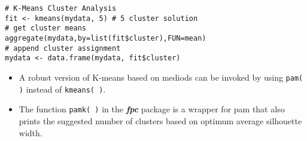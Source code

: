 \documentclass{beamer}
\begin{document}
\begin{frame}[fragile]
\begin{verbatim}  
# K-Means Cluster Analysis
fit <- kmeans(mydata, 5) # 5 cluster solution
# get cluster means 
aggregate(mydata,by=list(fit$cluster),FUN=mean)
# append cluster assignment
mydata <- data.frame(mydata, fit$cluster)
\end{verbatim}
\begin{itemize}
\item A robust version of K-means based on mediods can be invoked by using \texttt{pam( )} instead of \texttt{kmeans( )}. 
\item The function \texttt{pamk( )} in the \textbf{\textit{fpc}} package is a wrapper for pam that also prints the suggested number of clusters based on optimum average silhouette width.
\end{itemize}


\end{frame}
\end{document}
